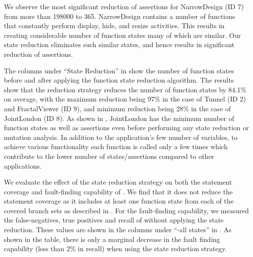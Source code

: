 We observe the most significant reduction of assertions for NarrowDesign (ID 7) from more than 198000 to 365. 
NarrowDesign contains a number of functions that constantly perform display, hide, and resize activities. This results in creating considerable number of function states many of which are similar. Our state reduction eliminates such similar states, and hence results in significant reduction of assertions.

The columns under ``State Reduction'' in  show the number of function states
before and after applying the function state reduction algorithm.   
The results show that the reduction strategy reduces the number of function states by 84.1\% on average, with 
the maximum reduction being 97\% in the case of Tunnel (ID 2) and FractalViewer (ID 9), and minimum reduction being 28\% in the case of JointLondon (ID 8).
As shown in , JointLondon has the minimum number of function states as well as assertions even before performing any state reduction or mutation analysis. In addition to the application's few number of variables, to achieve various functionality each function is called only a few times which contribute to the lower number of states/assertions compared to other applications.   

We evaluate the effect of the state reduction strategy on both the statement coverage and fault-finding capability of \tool.  
We find that it does not reduce the statement coverage as it includes at least one function state from each of the covered branch sets as described in . 
For the fault-finding capability, we measured the false-negatives, true positives and recall of \tool without applying the state reduction. These values are shown in
the columns under ``\tool-all states'' in .  As shown in the table, there is only a marginal decrease in the fault finding capability (less than 2\% in recall) when using the state reduction strategy.  

